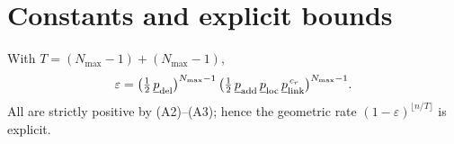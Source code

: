 \section{Constants and explicit bounds}
With $T=(N_{\max}-1)+(N_{\max}-1)$,
\[
\varepsilon = \big(\tfrac12\,\underline{p}_{\rm del}\big)^{N_{\max}-1}\,
             \big(\tfrac12\,\underline{p}_{\rm add}\,\underline{p}_{\rm loc}\,\underline{p}_{\rm link}^{\,c_r}\big)^{N_{\max}-1}.
\]
All are strictly positive by (A2)--(A3); hence the geometric rate $(1-\varepsilon)^{\lfloor n/T\rfloor}$ is explicit.

\nocite{Bombelli1987,Myrheim1978,Meyer1988Dim,BenincasaDowker2010,AslanbeigiEtAl2014,LevinPeresWilmer2009,MeynTweedie2009,Doeblin1937}

\FloatBarrier
\clearpage




